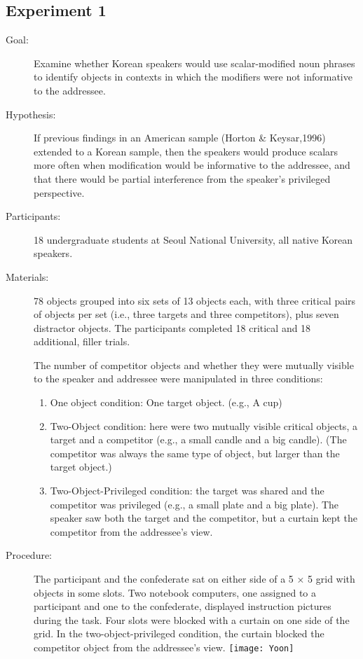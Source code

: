 \documentclass{article}
\begin{document}
\begin{multicols}{2}
\subsection{Experiment 1}
\begin{description}
	\item[Goal:] Examine whether Korean speakers would use scalar-modified noun phrases to identify objects in contexts in which the modifiers were not informative to the addressee.
	\item[Hypothesis:] If previous findings in an American sample (Horton \& Keysar,1996) extended to a Korean sample, then the speakers would produce scalars more often when modification would be informative to the addressee, and that there would be partial interference from the speaker's privileged perspective.
	\item[Participants:] 18 undergraduate students at Seoul National University, all native Korean speakers.
	\item[Materials:] 78 objects grouped into six sets of 13 objects each, with three critical pairs of objects per set (i.e., three targets and three competitors), plus seven distractor objects. The participants completed 18 critical and 18 additional, filler trials.\\\vspace{4mm}
	
	The number of competitor objects and whether they were mutually visible to the speaker and addressee were manipulated in three conditions:
	\begin{enumerate}
		\item One object condition: One target object. (e.g., A cup)
		\item Two-Object condition: here were two mutually visible critical objects, a target and a competitor (e.g., a small candle and a big candle). (The competitor was always the same type of object, but larger than the target object.)
		\item Two-Object-Privileged condition: the target was shared and the competitor was privileged (e.g., a small plate and a big plate). The speaker saw both the target and the competitor, but a curtain kept the competitor from the addressee's view.
	\end{enumerate}
	\item[Procedure:] The participant and the confederate sat on either side of a 5 × 5 grid with objects in some slots. Two notebook computers, one assigned to a participant and one to the confederate, displayed instruction pictures during the task. Four slots were blocked with a curtain on one side of the grid. In the two-object-privileged condition, the curtain blocked the competitor object from the addressee's view.
	\texttt{[image: Yoon]}
	

\end{description}
\end{multicols}
\end{document}
